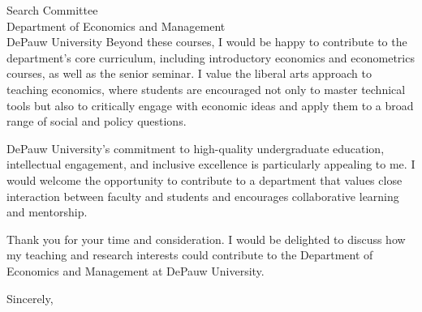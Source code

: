 \documentclass[11pt]{letter}
\begin{document}
\begin{letter}{Search Committee \\
Department of Economics and Management \\
DePauw University}
Beyond these courses, I would be happy to contribute to the department’s core curriculum, including introductory economics and econometrics courses, as well as the senior seminar. I value the liberal arts approach to teaching economics, where students are encouraged not only to master technical tools but also to critically engage with economic ideas and apply them to a broad range of social and policy questions.

DePauw University’s commitment to high-quality undergraduate education, intellectual engagement, and inclusive excellence is particularly appealing to me. I would welcome the opportunity to contribute to a department that values close interaction between faculty and students and encourages collaborative learning and mentorship.

Thank you for your time and consideration. I would be delighted to discuss how my teaching and research interests could contribute to the Department of Economics and Management at DePauw University.

\closing{Sincerely,}

\end{letter}
\end{document}
